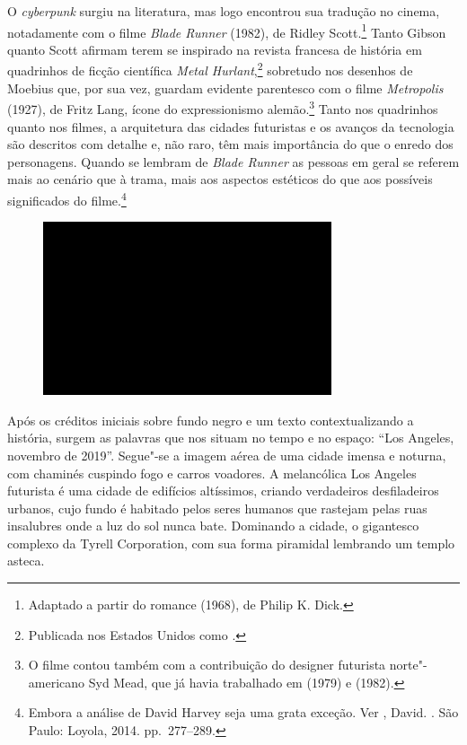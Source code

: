 O \emph{cyberpunk} surgiu na literatura, mas logo encontrou sua tradução
no cinema, notadamente com o filme \emph{Blade Runner} (1982), de Ridley
Scott.\footnote{Adaptado a partir do romance {} (1968), de Philip K. Dick.} Tanto Gibson quanto
Scott afirmam terem se inspirado na revista francesa de história em
quadrinhos de ficção científica \emph{Metal Hurlant},\footnote{Publicada nos Estados Unidos como
  {.}} sobretudo nos
desenhos de Moebius que, por sua vez, guardam evidente parentesco com
o filme \emph{Metropolis} (1927), de Fritz Lang, ícone do expressionismo
alemão.\footnote{O filme contou também com a contribuição do designer futurista norte"-americano Syd Mead, que já havia trabalhado em {} (1979) e {} (1982).} Tanto nos quadrinhos quanto nos filmes, a arquitetura das
cidades futuristas e os avanços da tecnologia são descritos com detalhe
e, não raro, têm mais importância do que o enredo dos personagens.
Quando se lembram de \emph{Blade Runner} as pessoas em geral se referem
mais ao cenário que à trama, mais aos aspectos estéticos do que aos
possíveis significados do filme.\footnote{Embora a análise de David
  Harvey seja uma grata exceção. Ver , David. {}. São Paulo: Loyola,
  2014. pp.~277--289.}

\begin{figure}[!ht]
\centering
 \includegraphics[width=85mm]{./imgs/im1.jpg}
\caption{\tiny{}}
\end{figure}

Após os créditos iniciais sobre fundo negro e um texto contextualizando
a história, surgem as palavras que nos situam no tempo e no espaço:
``Los Angeles, novembro de 2019''. Segue"-se a imagem aérea de uma cidade
imensa e noturna, com chaminés cuspindo fogo e carros voadores. A melancólica Los Angeles futurista é uma cidade de
edifícios altíssimos, criando verdadeiros desfiladeiros urbanos, cujo
fundo é habitado pelos seres humanos que rastejam pelas ruas insalubres
onde a luz do sol nunca bate. Dominando a cidade, o gigantesco complexo da
Tyrell Corporation, com sua forma piramidal lembrando um templo asteca.

